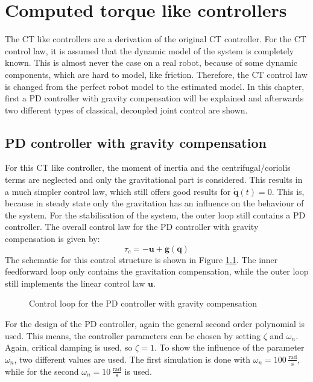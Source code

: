 \chapter{Computed torque like controllers}
The \ac{CT} like controllers are a derivation of the original \ac{CT} controller. For the \ac{CT} control law, it is assumed that the dynamic model of the system is completely known. This is almost never the case on a real robot, because of some dynamic components, which are hard to model, like friction. Therefore, the \ac{CT} control law is changed from the perfect robot model to the estimated model. In this chapter, first a PD controller with gravity compensation will be explained and afterwards two different types of classical, decoupled joint control are shown.
\section{PD controller with gravity compensation}
For this \ac{CT} like controller, the moment of inertia and the centrifugal/coriolis terms are neglected and only the gravitational part is considered. This results in a much simpler control law, which still offers good results for $\mathbf{\dot{q}}(t) = 0$. This is, because in steady state only the gravitation has an influence on the behaviour of the system. For the stabilisation of the system, the outer loop still contains a PD controller. The overall control law for the PD controller with gravity compensation is given by:
\begin{equation*}
	\tau_c = -\mathbf{u} + \mathbf{g}(\mathbf{q})
\end{equation*}
The schematic for this control structure is shown in Figure \ref{fig:ch3_pd_grav}. The inner feedforward loop only contains the gravitation compensation, while the outer loop still implements the linear control law $\mathbf{u}$.
\begin{figure}[H]
	\centering
	
	\caption{Control loop for the PD controller with gravity compensation}
	\label{fig:ch3_pd_grav}
\end{figure}
For the design of the PD controller, again the general second order polynomial is used. This means, the controller parameters can be chosen by setting $\zeta$ and $\omega_n$. Again, critical damping is used, so $\zeta = 1$. To show the influence of the parameter $\omega_n$, two different values are used. The first simulation is done with $\omega_n = 100\,\mathrm{\frac{rad}{s}}$, while for the second $\omega_n = 10\,\mathrm{\frac{rad}{s}}$ is used.\\
